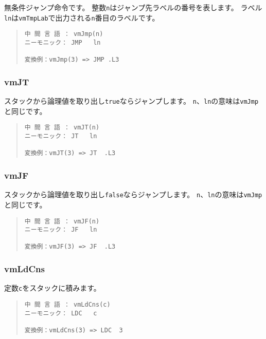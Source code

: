 無条件ジャンプ命令です。
整数\verb/n/はジャンプ先ラベルの番号を表します。
ラベル\verb/ln/は\verb/vmTmpLab/で出力される\verb/n/番目のラベルです。

\begin{quote}
\begin{verbatim}
中 間 言 語 ： vmJmp(n)
ニーモニック： JMP   ln

変換例：vmJmp(3) => JMP .L3
\end{verbatim}
\end{quote}

\subsubsection{vmJT}

スタックから論理値を取り出し\verb/true/ならジャンプします。
\verb/n/、\verb/ln/の意味は\verb/vmJmp/と同じです。

\begin{quote}
\begin{verbatim}
中 間 言 語 ： vmJT(n)
ニーモニック： JT   ln

変換例：vmJT(3) => JT  .L3
\end{verbatim}
\end{quote}

\subsubsection{vmJF}

スタックから論理値を取り出し\verb/false/ならジャンプします。
\verb/n/、\verb/ln/の意味は\verb/vmJmp/と同じです。

\begin{quote}
\begin{verbatim}
中 間 言 語 ： vmJF(n)
ニーモニック： JF   ln

変換例：vmJF(3) => JF  .L3
\end{verbatim}
\end{quote}

\subsubsection{vmLdCns}

定数\verb/c/をスタックに積みます。

\begin{quote}
\begin{verbatim}
中 間 言 語 ： vmLdCns(c)
ニーモニック： LDC   c

変換例：vmLdCns(3) => LDC  3
\end{verbatim}
\end{quote}


